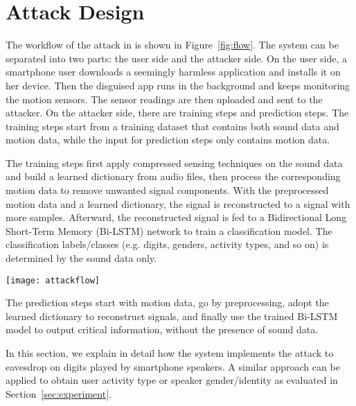 \section{Attack Design}\label{sec:design}


The workflow of the {\attackName} attack in {\systemName} is shown in Figure~\ref{fig:flow}. The system can be separated into two parts: the user side and the attacker side. 
%
On the user side, a smartphone user downloads a seemingly harmless application and installs it on her device. Then the disguised app runs in the background and keeps monitoring the motion sensors. The sensor readings are then uploaded and sent to the attacker. 
%
On the attacker side, there are training steps and prediction steps. The training steps start from a training dataset that contains both sound data and motion data, while the input for prediction steps only contains motion data. 

The training steps first apply compressed sensing techniques on the sound data and build a learned dictionary from audio files, then process the corresponding motion data to remove unwanted signal components. With the preprocessed motion data and a learned dictionary,  the signal is reconstructed to a signal with more samples. Afterward, the reconstructed signal is fed to a Bidirectional Long Short-Term Memory (Bi-LSTM) network to train a classification model. 
The classification labels/classes (e.g. digits, genders, activity types, and so on) is determined by the sound data only.


\begin{landscape}
\begin{figure*}[h]
	\centering
	\texttt{[image: attackflow]}
	\caption{The {\attackName} Attack Workflow in the {\systemName} System. }
	\label{fig:flow}
\end{figure*}
\end{landscape}



The prediction steps start with motion data, go by preprocessing, adopt the learned dictionary to reconstruct signals, and finally use the trained Bi-LSTM model to output critical information, without the presence of sound data.



In this section, we explain in detail how the {\systemName} system implements the {\attackName} attack to eavesdrop on digits played by smartphone speakers. A similar approach can be applied to obtain user activity type or speaker gender/identity as evaluated in Section~\ref{sec:experiment}.


